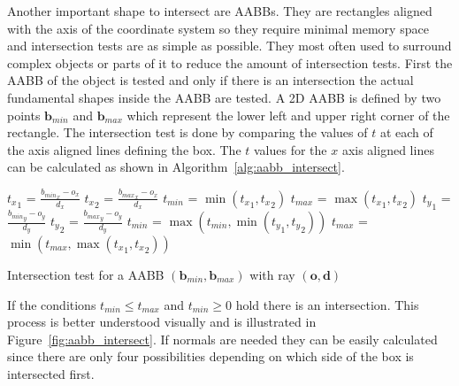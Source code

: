 \documentclass[a4paper,10pt]{article}
\renewcommand{\vec}[1]{\mathbf{#1}}
\newcommand{\figref}[1]{Figure~\ref{#1}}
\newcommand{\algref}[1]{Algorithm~\ref{#1}}
\begin{document}
    Another important shape to intersect are AABBs.
    They are rectangles aligned with the axis of the coordinate system
    so they require minimal memory space and intersection tests are
    as simple as possible.
    They most often used to surround complex objects or parts of it
    to reduce the amount of intersection tests.
    First the AABB of the object is tested and only if there is an
    intersection the actual fundamental shapes inside the AABB are tested.
    A 2D AABB is defined by two points $\vec{b}_{min}$ and $\vec{b}_{max}$ which
    represent the lower left and upper right corner of the rectangle.
    The intersection test is done by comparing the values of $t$ at each
    of the axis aligned lines defining the box.
    The $t$ values for the $x$ axis aligned lines can be calculated as
    shown in \algref{alg:aabb_intersect}.

    \begin{algorithm}
        \label{alg:aabb_intersect}
        \SetAlgoLined

        ${t_x}_1$ = $\frac{{b_{min}}_x - o_x}{d_x}$\;
        ${t_x}_2$ = $\frac{{b_{max}}_x - o_x}{d_x}$\;
        $t_{min}$ = $\min({t_x}_1, {t_x}_2)$\;
        $t_{max}$ = $\max({t_x}_1, {t_x}_2)$\;
        ${t_y}_1$ = $\frac{{b_{min}}_y - o_y}{d_y}$\;
        ${t_y}_2$ = $\frac{{b_{max}}_y - o_y}{d_y}$\;
        $t_{min}$ = $\max(t_{min}, \min({t_y}_1, {t_y}_2))$\;
        $t_{max}$ = $\min(t_{max}, \max({t_x}_1, {t_x}_2))$\;

        \caption{
        Intersection test for a AABB $(\vec{b}_{min}, \vec{b}_{max})$
        with ray $(\vec{o}, \vec{d})$
        }
    \end{algorithm}

    If the conditions $t_{min} \leq t_{max}$ and $t_{min} \geq 0$ hold
    there is an intersection.
    This process is better understood visually and is illustrated in 
    \figref{fig:aabb_intersect}.
    If normals are needed they can be easily calculated since there are
    only four possibilities depending on which side of the box is
    intersected first. 
\end{document}
